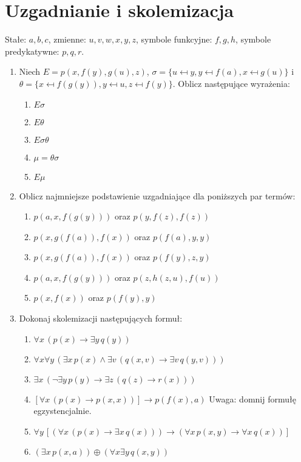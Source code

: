 \documentclass{mwart}
\begin{document}
\section*{Uzgadnianie i skolemizacja}
Stałe: $a, b, c$, zmienne: $u, v, w, x, y, z$, symbole funkcyjne: $f, g, h$, symbole predykatywne: $p, q, r$.

\begin{enumerate}
	\item Niech $E=p(x, f(y), g(u), z)$, $\sigma=\{u\mapsfrom y, y\mapsfrom f(a), x\mapsfrom g(u)\}$ i $\theta=\{x\mapsfrom f(g(y)), y\mapsfrom u, z\mapsfrom f(y)\}$. Oblicz następujące wyrażenia:
		\begin{multicols}{5}
			\begin{enumerate}
				\item $E\sigma$
				\item $E\theta$
				\item $E\sigma\theta$
				\item $\mu=\theta\sigma$
				\item $E\mu$
			\end{enumerate}
		\end{multicols}
	\item Oblicz najmniejsze podstawienie uzgadniające dla poniższych par termów:
		\begin{enumerate}
			\item $p(a, x, f(g(y)))$ oraz $p(y, f(z), f(z))$
			\item $p(x, g(f(a)), f(x))$ oraz $p(f(a), y, y)$
			\item $p(x, g(f(a)), f(x))$ oraz $p(f(y), z, y)$
			\item $p(a, x, f(g(y)))$ oraz $p(z, h(z, u), f(u))$
			\item $p(x, f(x))$ oraz $p(f(y), y)$
		\end{enumerate}
	\item Dokonaj skolemizacji następujących formuł:
		\begin{enumerate}
			\item $\forall x\,(p(x)\to\exists y\,q(y))$
			\item $\forall x\forall y\,(\exists x\,p(x)\land \exists v\,(q(x, v)\to \exists v\,q(y,v)))$
			\item $\exists x\,(\lnot\exists y\,p(y)\to \exists z\,(q(z)\to r(x)))$
			\item $[\forall x\,(p(x)\to p(x, x))]\to p(f(x), a)$ Uwaga: domnij formułę egzystencjalnie.
			\item $\forall y\,[(\forall x\,(p(x)\to \exists x\, q(x))) \to (\forall x\,p(x, y)\to \forall x\,q(x))]$
			\item $\left(\exists x\, p(x,a)\right)\oplus\left(\forall x\exists y\, q(x,y)\right)$
		\end{enumerate}
\end{enumerate}
\end{document}
